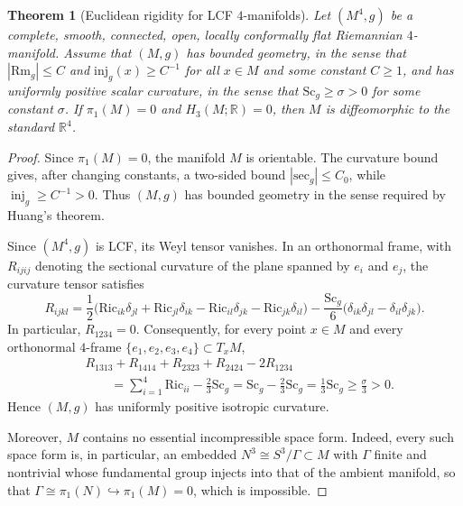 \documentclass[12pt,oneside,a4paper]{article}
\theoremstyle{mytheorem}
\newtheorem{theorem}[definition]{Theorem}
\theoremstyle{remark}
\theoremstyle{definition}
\begin{document}
\begin{theorem}[Euclidean rigidity for LCF \(4\)-manifolds]\label{LCF-4-manifold}
Let \((M^4,g)\) be a complete, smooth, connected, open, locally
conformally flat Riemannian \(4\)-manifold. Assume that \((M,g)\) has
bounded geometry, in the sense that \(|\mathrm{Rm}_g|\leq C\) and
\(\mathrm{inj}_g(x)\geq C^{-1}\) for all \(x\in M\) and some constant
\(C\geq1\), and has uniformly positive scalar curvature, in the sense that
\(\mathrm{Sc}_g\geq \sigma>0\) for some constant \(\sigma\). If
\(\pi_1(M)=0\) and \(H_3(M;\mathbb R)=0\), then \(M\) is diffeomorphic
to the standard \(\mathbb R^4\).
\end{theorem}

\begin{proof}
Since \(\pi_1(M)=0\), the manifold \(M\) is orientable. The curvature
bound gives, after changing constants, a two-sided bound
\(|\mathrm{sec}_g|\leq C_0\), while
\(\operatorname{inj}_g\geq C^{-1}>0\). Thus \((M,g)\) has bounded geometry
in the sense required by Huang's theorem.

Since \((M^4,g)\) is LCF, its Weyl tensor vanishes. In an orthonormal frame,
with \(R_{ijij}\) denoting the sectional curvature of the plane spanned by
\(e_i\) and \(e_j\), the curvature tensor satisfies
\[
R_{ijkl}
=
\frac{1}{2}
\bigl(
\mathrm{Ric}_{ik}\delta_{jl}
+\mathrm{Ric}_{jl}\delta_{ik}
-\mathrm{Ric}_{il}\delta_{jk}
-\mathrm{Ric}_{jk}\delta_{il}
\bigr)
-
\frac{\mathrm{Sc}_g}{6}
\bigl(
\delta_{ik}\delta_{jl}
-\delta_{il}\delta_{jk}
\bigr).
\]
In particular, \(R_{1234}=0\). Consequently, for every point \(x\in M\)
and every orthonormal \(4\)-frame \(\{e_1,e_2,e_3,e_4\}\subset T_xM\),
\[
\begin{aligned}
&R_{1313}+R_{1414}+R_{2323}+R_{2424}-2R_{1234}\\
&\qquad
=\sum_{i=1}^{4}\mathrm{Ric}_{ii}-\frac{2}{3}\mathrm{Sc}_g
=\mathrm{Sc}_g-\frac{2}{3}\mathrm{Sc}_g
=\frac{1}{3}\mathrm{Sc}_g
\geq\frac{\sigma}{3}>0.
\end{aligned}
\]
Hence \((M,g)\) has uniformly positive isotropic curvature.

Moreover, \(M\) contains no essential incompressible space form. Indeed, every
such space form is, in particular, an embedded \(N^3\cong S^3/\Gamma\subset M\) with \(\Gamma\) finite
and nontrivial whose fundamental group injects into that of the ambient manifold,
so that \(\Gamma\cong\pi_1(N)\hookrightarrow\pi_1(M)=0\), which is impossible.


\end{proof}
\end{document}
